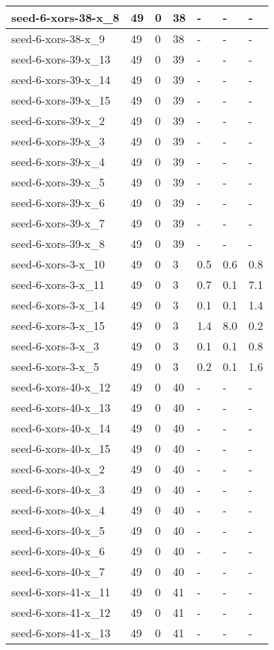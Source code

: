 \begin{scriptsize}
\begin{longtable}{|p{5cm}|l|l|l|l|l|l|}
seed-6-xors-38-x\_8&49&0&38&-&-&- \\ \hline 
seed-6-xors-38-x\_9&49&0&38&-&-&- \\ \hline 
seed-6-xors-39-x\_13&49&0&39&-&-&- \\ \hline 
seed-6-xors-39-x\_14&49&0&39&-&-&- \\ \hline 
seed-6-xors-39-x\_15&49&0&39&-&-&- \\ \hline 
seed-6-xors-39-x\_2&49&0&39&-&-&- \\ \hline 
seed-6-xors-39-x\_3&49&0&39&-&-&- \\ \hline 
seed-6-xors-39-x\_4&49&0&39&-&-&- \\ \hline 
seed-6-xors-39-x\_5&49&0&39&-&-&- \\ \hline 
seed-6-xors-39-x\_6&49&0&39&-&-&- \\ \hline 
seed-6-xors-39-x\_7&49&0&39&-&-&- \\ \hline 
seed-6-xors-39-x\_8&49&0&39&-&-&- \\ \hline 
seed-6-xors-3-x\_10&49&0&3&0.5&0.6&0.8 \\ \hline 
seed-6-xors-3-x\_11&49&0&3&0.7&0.1&7.1 \\ \hline 
seed-6-xors-3-x\_14&49&0&3&0.1&0.1&1.4 \\ \hline 
seed-6-xors-3-x\_15&49&0&3&1.4&8.0&0.2 \\ \hline 
seed-6-xors-3-x\_3&49&0&3&0.1&0.1&0.8 \\ \hline 
seed-6-xors-3-x\_5&49&0&3&0.2&0.1&1.6 \\ \hline 
seed-6-xors-40-x\_12&49&0&40&-&-&- \\ \hline 
seed-6-xors-40-x\_13&49&0&40&-&-&- \\ \hline 
seed-6-xors-40-x\_14&49&0&40&-&-&- \\ \hline 
seed-6-xors-40-x\_15&49&0&40&-&-&- \\ \hline 
seed-6-xors-40-x\_2&49&0&40&-&-&- \\ \hline 
seed-6-xors-40-x\_3&49&0&40&-&-&- \\ \hline 
seed-6-xors-40-x\_4&49&0&40&-&-&- \\ \hline 
seed-6-xors-40-x\_5&49&0&40&-&-&- \\ \hline 
seed-6-xors-40-x\_6&49&0&40&-&-&- \\ \hline 
seed-6-xors-40-x\_7&49&0&40&-&-&- \\ \hline 
seed-6-xors-41-x\_11&49&0&41&-&-&- \\ \hline 
seed-6-xors-41-x\_12&49&0&41&-&-&- \\ \hline 
seed-6-xors-41-x\_13&49&0&41&-&-&- \\ \hline 

\end{longtable}
\end{scriptsize}
